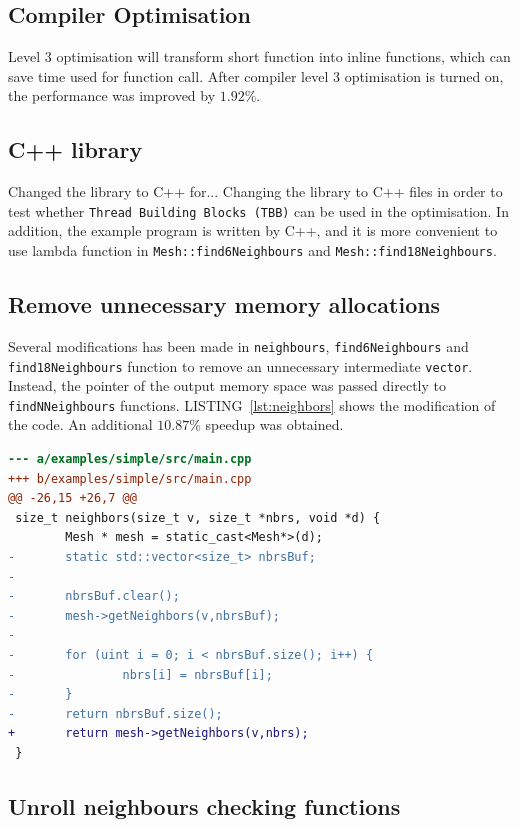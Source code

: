 \documentclass[conference]{IEEEtran}
\newcommand{\lref}[1]{LISTING~\ref{#1}}
\begin{document}
\subsection{Compiler Optimisation}

Level 3 optimisation will transform short function into inline functions, which can save time used for function call. After compiler level 3 optimisation is turned on, the performance was improved by $1.92\%$.

\subsection{C++ library}

Changed the library to C++ for...
Changing the library to C++ files in order to test whether \texttt{Thread Building Blocks (TBB)} can be used in the optimisation. In addition, the example program is written by C++, and it is more convenient to use lambda function in \texttt{Mesh::find6Neighbours} and \texttt{Mesh::find18Neighbours}. 

\subsection{Remove unnecessary memory allocations}

Several modifications has been made in \texttt{neighbours}, \texttt{find6Neighbours} and \texttt{find18Neighbours} function to remove an unnecessary intermediate \texttt{vector}. Instead, the pointer of the output memory space was passed directly to \texttt{findNNeighbours} functions. \lref{lst:neighbors} shows the modification of the code. An additional $10.87\%$ speedup was obtained.

\begin{lstlisting}[language=diff,label=lst:neighbors]
--- a/examples/simple/src/main.cpp
+++ b/examples/simple/src/main.cpp
@@ -26,15 +26,7 @@
 size_t neighbors(size_t v, size_t *nbrs, void *d) {
        Mesh * mesh = static_cast<Mesh*>(d);
-       static std::vector<size_t> nbrsBuf;
-
-       nbrsBuf.clear();
-       mesh->getNeighbors(v,nbrsBuf);
-
-       for (uint i = 0; i < nbrsBuf.size(); i++) {
-               nbrs[i] = nbrsBuf[i];
-       }
-       return nbrsBuf.size();
+       return mesh->getNeighbors(v,nbrs);
 }
\end{lstlisting}

\subsection{Unroll neighbours checking functions}
\end{document}
